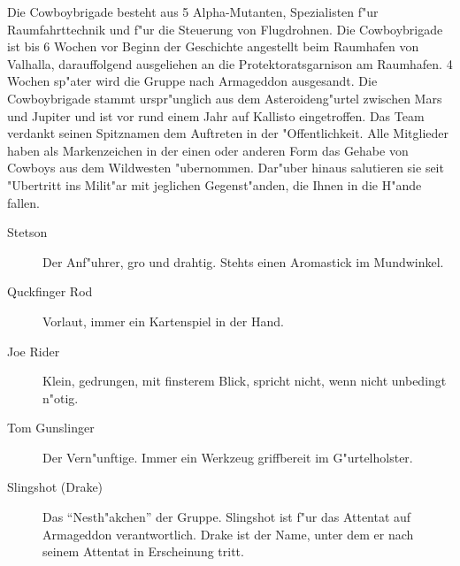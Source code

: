 
Die Cowboybrigade besteht aus 5 Alpha-Mutanten, Spezialisten f"ur Raumfahrttechnik und f"ur die Steuerung von Flugdrohnen. 
Die Cowboybrigade ist bis 6 Wochen vor Beginn der Geschichte angestellt beim Raumhafen von Valhalla, darauffolgend ausgeliehen an die Protektoratsgarnison am Raumhafen. 4 Wochen sp"ater wird die Gruppe nach Armageddon ausgesandt. Die Cowboybrigade stammt urspr"unglich aus dem Asteroideng"urtel zwischen Mars und Jupiter und ist vor rund einem Jahr auf Kallisto eingetroffen. Das Team verdankt seinen Spitznamen dem Auftreten in der "Offentlichkeit. Alle Mitglieder haben als Markenzeichen in der einen oder anderen Form das Gehabe von Cowboys aus dem Wildwesten  "ubernommen. Dar"uber hinaus salutieren sie seit "Ubertritt ins Milit"ar mit jeglichen Gegenst"anden, die Ihnen in die H"ande fallen.

\begin{description}
    \item[Stetson] Der Anf"uhrer, gro\3 und drahtig. Stehts einen Aromastick im Mundwinkel.
    \item[Quckfinger Rod] Vorlaut, immer ein Kartenspiel in der Hand.
    \item[Joe Rider] Klein, gedrungen, mit finsterem Blick, spricht nicht, wenn nicht unbedingt n"otig.
    \item[Tom Gunslinger] Der Vern"unftige. Immer ein Werkzeug griffbereit im G"urtelholster. 
    \item[Slingshot (Drake)] Das "`Nesth"akchen"' der Gruppe. Slingshot ist f"ur das Attentat auf Armageddon verantwortlich. 
        Drake ist der Name, unter dem er nach seinem Attentat in Erscheinung tritt.
\end{description}

\newpage
